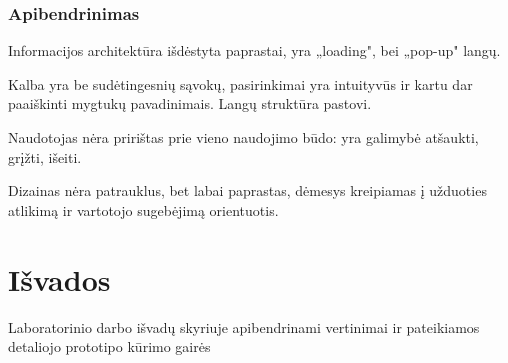 \documentclass{VUMIFPSkursinis}
\begin{document}
\subsubsection{Apibendrinimas}
Informacijos architektūra išdėstyta paprastai, yra „loading", bei „pop-up" langų.

Kalba yra be sudėtingesnių sąvokų, pasirinkimai yra intuityvūs ir kartu dar paaiškinti mygtukų pavadinimais. Langų struktūra pastovi.

Naudotojas nėra pririštas prie vieno naudojimo būdo: yra galimybė atšaukti, grįžti, išeiti.

Dizainas nėra patrauklus, bet labai paprastas, dėmesys kreipiamas į užduoties atlikimą ir vartotojo sugebėjimą orientuotis.

\section{Išvados}
Laboratorinio darbo išvadų skyriuje apibendrinami vertinimai ir pateikiamos detaliojo prototipo kūrimo gairės


















\printbibliography[heading=bibintoc, title=Šaltiniai]  %
\end{document}

